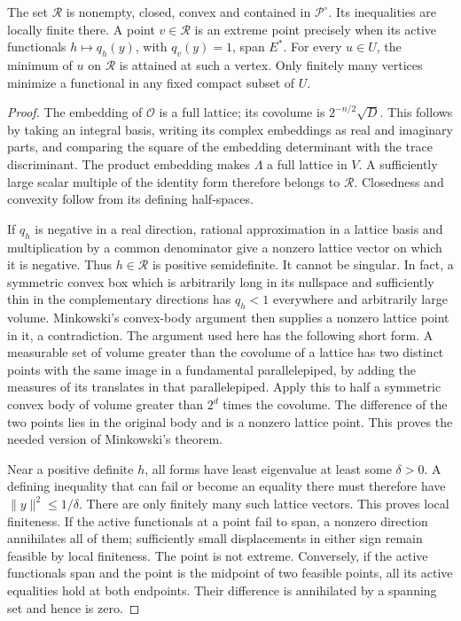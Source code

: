 \begin{proposition}
\label{prop:tb-hermitian-geometry}
The set $\mathcal R$ is nonempty, closed, convex and contained in
$\mathcal P^\circ$.  Its inequalities are locally finite there.
A point $v\in\mathcal R$ is an extreme point precisely when its
active functionals $h\mapsto q_h(y)$, with $q_v(y)=1$, span $E^*$.
For every $u\in U$, the minimum of $u$ on $\mathcal R$ is attained
at such a vertex.  Only finitely many vertices minimize a functional
in any fixed compact subset of $U$.
\end{proposition}

\begin{proof}
The embedding of $\mathcal O$ is a full lattice; its covolume is
$2^{-n/2}\sqrt D$.  This follows by taking an integral basis,
writing its complex embeddings as real and imaginary parts, and
comparing the square of the embedding determinant with the trace
discriminant.  The product embedding makes $\Lambda$ a full lattice
in $V$.  A sufficiently large scalar multiple of the identity form
therefore belongs to $\mathcal R$.  Closedness and convexity follow
from its defining half-spaces.

If $q_h$ is negative in a real direction, rational approximation in
a lattice basis and multiplication by a common denominator give a
nonzero lattice vector on which it is negative.  Thus $h\in\mathcal R$
is positive semidefinite.  It cannot be singular.  In fact, a
symmetric convex box which is arbitrarily long in its nullspace
and sufficiently thin in the complementary directions has
$q_h<1$ everywhere and arbitrarily large volume.  Minkowski's
convex-body argument then supplies a nonzero lattice point in it,
a contradiction.  The argument used here has the following short
form.  A measurable set of volume greater than the covolume of a
lattice has two distinct points with the same image in a fundamental
parallelepiped, by adding the measures of its translates in that
parallelepiped.  Apply this to half a symmetric convex body of
volume greater than $2^d$ times the covolume.  The difference of
the two points lies in the original body and is a nonzero lattice
point.  This proves the needed version of Minkowski's theorem.

Near a positive definite $h$, all forms have least eigenvalue at
least some $\delta>0$.  A defining inequality that can fail or become
an equality there must therefore have $\|y\|^2\le1/\delta$.
There are only finitely many such lattice vectors.  This proves
local finiteness.  If the active functionals at a point fail to
span, a nonzero direction annihilates all of them; sufficiently
small displacements in either sign remain feasible by local
finiteness.  The point is not extreme.  Conversely, if the active
functionals span and the point is the midpoint of two feasible
points, all its active equalities hold at both endpoints.  Their
difference is annihilated by a spanning set and hence is zero.


\end{proof}
